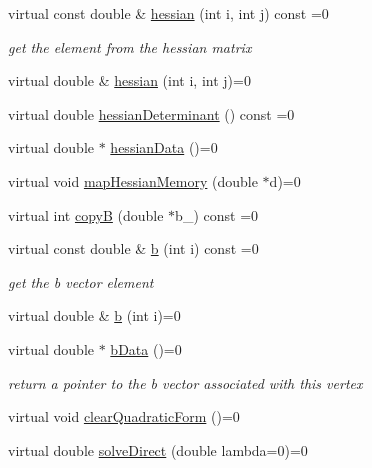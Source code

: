 \begin{DoxyCompactItemize}
virtual const double \& \mbox{\hyperlink{classg2o_1_1_optimizable_graph_1_1_vertex_af46fa4f0baa4c87e29b137f24e713acb}{hessian}} (int i, int j) const =0
\begin{DoxyCompactList}\small\item\em get the element from the hessian matrix \end{DoxyCompactList}\item 
virtual double \& \mbox{\hyperlink{classg2o_1_1_optimizable_graph_1_1_vertex_ade95d46370bb9a86f64c4e591726ad62}{hessian}} (int i, int j)=0
\item 
virtual double \mbox{\hyperlink{classg2o_1_1_optimizable_graph_1_1_vertex_adaed502500d9ddc9f1721aba635da4d6}{hessian\+Determinant}} () const =0
\item 
virtual double $\ast$ \mbox{\hyperlink{classg2o_1_1_optimizable_graph_1_1_vertex_a4ec536d8c82d839e507d89c7a7e368ae}{hessian\+Data}} ()=0
\item 
virtual void \mbox{\hyperlink{classg2o_1_1_optimizable_graph_1_1_vertex_a1008c0f7981a9fb11be3e3df5c4a9758}{map\+Hessian\+Memory}} (double $\ast$d)=0
\item 
virtual int \mbox{\hyperlink{classg2o_1_1_optimizable_graph_1_1_vertex_af544f0050ea6e05950fd6e53931bdf61}{copyB}} (double $\ast$b\+\_\+) const =0
\item 
virtual const double \& \mbox{\hyperlink{classg2o_1_1_optimizable_graph_1_1_vertex_a79afa60eb11928eeeb1b97f2d2a30732}{b}} (int i) const =0
\begin{DoxyCompactList}\small\item\em get the b vector element \end{DoxyCompactList}\item 
virtual double \& \mbox{\hyperlink{classg2o_1_1_optimizable_graph_1_1_vertex_af2d92761ad2732b6e9b19bd52fa2a19b}{b}} (int i)=0
\item 
virtual double $\ast$ \mbox{\hyperlink{classg2o_1_1_optimizable_graph_1_1_vertex_a84465a61c6d322f7d64833129cc7d55a}{b\+Data}} ()=0
\begin{DoxyCompactList}\small\item\em return a pointer to the b vector associated with this vertex \end{DoxyCompactList}\item 
virtual void \mbox{\hyperlink{classg2o_1_1_optimizable_graph_1_1_vertex_a803897f6bae25dece4d7e23330f0f9da}{clear\+Quadratic\+Form}} ()=0
\item 
virtual double \mbox{\hyperlink{classg2o_1_1_optimizable_graph_1_1_vertex_a61c4e7b7a7a61e1f287069a8cb01004f}{solve\+Direct}} (double lambda=0)=0

\end{DoxyCompactItemize}
